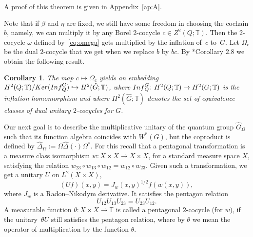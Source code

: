 \documentclass[a4paper,11pt,reqno]{amsart}
\numberwithin{equation}{section}
\newtheorem{corollary}[theorem]{Corollary}
\theoremstyle{remark}
\theoremstyle{definition}
\newcommand\Dhat{{\hat\Delta}}
\newcommand\T{{\mathbb T}}
\begin{document}
A proof of this theorem is given in Appendix~\ref{ap:A}.

\smallskip

Note that if $\beta$ and $\eta$ are fixed, we still have some freedom in choosing the cochain $b$, namely, we can multiply it by any Borel $2$-cocycle $c\in Z^2(Q;\T)$. Then the $2$-cocycle $\omega$ defined by~\eqref{eq:omega} gets multiplied by the inflation of~$c$ to~$G$. Let $\Omega_c$ be the dual $2$-cocycle that we get when we replace $b$ by $bc$. By \cite{BGNT3}*{Corollary 2.8} we obtain the following result.

\begin{corollary}
The map $ c \mapsto \Omega_c$ yields an embedding  $H^2(Q;\mathbb T)/{\rm Ker}({\rm Inf}_Q^G)\hookrightarrow H^2(\hat G;\mathbb T)$, where ${\rm Inf}_Q^G\colon H^2(Q;\mathbb T)\to H^2(G;\mathbb T)$ is the  inflation homomorphism and where $H^2(\hat G;\mathbb T)$ denotes the set of equivalence classes of dual unitary $2$-cocycles for $G$.
\end{corollary}

Our next goal is to describe the multiplicative unitary of the quantum group $\hat G_\Omega$ such that its function algebra coincides with $W^*(G)$, but the coproduct is defined by $\Dhat_\Omega:=\Omega\Dhat(\cdot)\Omega^*$. For this recall that a pentagonal transformation is a
measure class isomorphism $w\colon X\times X \to X\times X$, for a standard measure space $X$, satisfying
the relation $w_{23}\circ w_{13}\circ w_{12} = w_{12}\circ w_{23}$. Given such a transformation, we get a unitary $U$ on $L^2(X\times X)$,
$$
(Uf)(x,y)=J_w(x,y)^{1/2}f(w(x,y)),
$$
where $J_w$ is a Radon--Nikodym derivative. It satisfies the pentagon relation
$$
U_{12}U_{13}U_{23} =U_{23}U_{12}.
$$
A measurable function $\theta\colon X\times X\to\T$ is called a pentagonal $2$-cocycle (for $w$), if the unitary~$\theta U$ still satisfies the pentagon relation, where by $\theta$ we mean the operator of multiplication by the function $\theta$.
\end{document}
